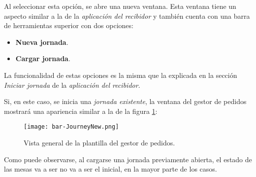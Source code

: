 Al seleccionar esta opción, se abre una nueva ventana. Esta ventana tiene un
aspecto similar a la de la \emph{aplicación del recibidor} y también cuenta
con una barra de herramientas superior con dos opciones:
\begin{itemize}
\item \textbf{Nueva jornada}.
\item \textbf{Cargar jornada}.
\end{itemize}
La funcionalidad de estas opciones es la misma que la explicada en la sección
\emph{Iniciar jornada} de la \emph{aplicación del recibidor}.

Si, en este caso, se inicia una \emph{jornada existente}, la ventana del gestor 
de pedidos mostrará una apariencia similar a la de la figura
\ref{fig:bar-JourneyNew}:

  \begin{figure}[H]
    \begin{center}
      \texttt{[image: bar-JourneyNew.png]}
      \caption{Vista general de la plantilla del gestor de pedidos.}
      \label{fig:bar-JourneyNew}
    \end{center}
  \end{figure}

Como puede observarse, al cargarse una jornada previamente abierta, el estado 
de las mesas va a ser no va a ser el inicial, en la mayor parte de los casos.

